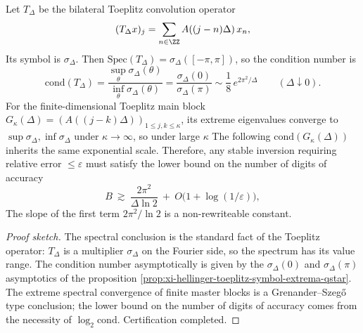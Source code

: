 \begin{proposition}\label{prop:xi-hellinger-toeplitz-conditioning-exponential-law}
Let \(T_\Delta\) be the bilateral Toeplitz convolution operator
\[
(T_\Delta x)_j=\sum_{n\in\ZZ}A((j-n)\Delta)\,x_n,
\]
Its symbol is \(\sigma_\Delta\).
Then \(\mathrm{Spec}(T_\Delta)=\sigma_\Delta([-\pi,\pi])\), so the condition number is
\[
\mathrm{cond}(T_\Delta)=\frac{\sup_\theta\sigma_\Delta(\theta)}{\inf_\theta\sigma_\Delta(\theta)}
=\frac{\sigma_\Delta(0)}{\sigma_\Delta(\pi)}
\sim \frac18\,e^{2\pi^2/\Delta}\qquad(\Delta\downarrow 0).
\]
For the finite-dimensional Toeplitz main block \(G_\kappa(\Delta)=(A((j-k)\Delta))_{1\le j,k\le\kappa}\), its extreme eigenvalues converge to \(\sup\sigma_\Delta,\inf\sigma_\Delta\) under \(\kappa\to\infty\), so under large \(\kappa\) The following \(\mathrm{cond}(G_\kappa(\Delta))\) inherits the same exponential scale.
Therefore, any stable inversion requiring relative error \(\le\varepsilon\) must satisfy the lower bound on the number of digits of accuracy
\[
B\ \gtrsim\ \frac{2\pi^2}{\Delta\ln 2}\ +\ O\bigl(1+\log(1/\varepsilon)\bigr),
\]
The slope of the first term \(2\pi^2/\ln2\) is a non-rewriteable constant.
\end{proposition}
\begin{proof}[Proof sketch]
The spectral conclusion is the standard fact of the Toeplitz operator: \(T_\Delta\) is a multiplier \(\sigma_\Delta\) on the Fourier side, so the spectrum has its value range.
The condition number asymptotically is given by the \(\sigma_\Delta(0)\) and \(\sigma_\Delta(\pi)\) asymptotics of the proposition \ref{prop:xi-hellinger-toeplitz-symbol-extrema-qstar}.
The extreme spectral convergence of finite master blocks is a Grenander--Szeg\H{o} type conclusion; the lower bound on the number of digits of accuracy comes from the necessity of \(\log_2\mathrm{cond}\). Certification completed.
\end{proof}

